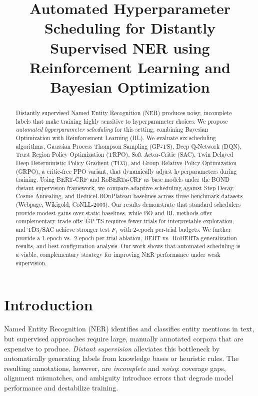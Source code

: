 \documentclass[11pt]{article}
\title{Automated Hyperparameter Scheduling for Distantly Supervised NER using Reinforcement Learning and Bayesian Optimization}
\author{}
\begin{document}
\maketitle

\begin{abstract}
Distantly supervised Named Entity Recognition (NER) produces noisy, incomplete labels that make training highly sensitive to hyperparameter choices. We propose \textit{automated hyperparameter scheduling} for this setting, combining Bayesian Optimization with Reinforcement Learning (RL). We evaluate six scheduling algorithms, Gaussian Process Thompson Sampling (GP-TS), Deep Q-Network (DQN), Trust Region Policy Optimization (TRPO), Soft Actor-Critic (SAC), Twin Delayed Deep Deterministic Policy Gradient (TD3), and Group Relative Policy Optimization (GRPO), a critic-free PPO variant, that dynamically adjust hyperparameters during training. Using BERT-CRF and RoBERTa-CRF as base models under the BOND distant supervision framework, we compare adaptive scheduling against Step Decay, Cosine Annealing, and ReduceLROnPlateau baselines across three benchmark datasets (Webpage, Wikigold, CoNLL-2003). Our results demonstrate that standard schedulers provide modest gains over static baselines, while BO and RL methods offer complementary trade-offs: GP-TS requires fewer trials for interpretable exploration, and TD3/SAC achieve stronger test $F_1$ with 2-epoch per-trial budgets. We further provide a 1-epoch vs.\ 2-epoch per-trial ablation, BERT vs.\ RoBERTa generalization results, and best-configuration analysis. Our work shows that automated scheduling is a viable, complementary strategy for improving NER performance under weak supervision.
\end{abstract}

\section{Introduction}

Named Entity Recognition (NER) identifies and classifies entity mentions in text, but supervised approaches require large, manually annotated corpora that are expensive to produce. \textit{Distant supervision} alleviates this bottleneck by automatically generating labels from knowledge bases or heuristic rules. The resulting annotations, however, are \textit{incomplete} and \textit{noisy}: coverage gaps, alignment mismatches, and ambiguity introduce errors that degrade model performance and destabilize training.
\end{document}
